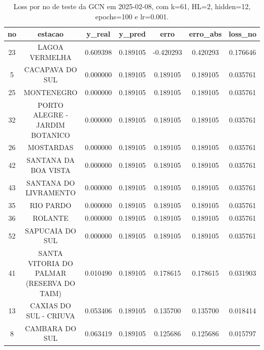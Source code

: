 \begin{table}[h]
\centering
\caption{Loss por no de teste da GCN em 2025-02-08, com k=61, HL=2, hidden=12, epochs=100 e lr=0.001.}
\label{tab:gcn_loss_k61_hl2_h12_e100_d20250208}
\begin{tabular}{ccccccc}
\toprule
no & estacao & y\_real & y\_pred & erro & erro\_abs & loss\_no \\
\midrule
23 & LAGOA VERMELHA & 0.609398 & 0.189105 & -0.420293 & 0.420293 & 0.176646 \\
5 & CACAPAVA DO SUL & 0.000000 & 0.189105 & 0.189105 & 0.189105 & 0.035761 \\
25 & MONTENEGRO & 0.000000 & 0.189105 & 0.189105 & 0.189105 & 0.035761 \\
32 & PORTO ALEGRE - JARDIM BOTANICO & 0.000000 & 0.189105 & 0.189105 & 0.189105 & 0.035761 \\
26 & MOSTARDAS & 0.000000 & 0.189105 & 0.189105 & 0.189105 & 0.035761 \\
42 & SANTANA DA BOA VISTA & 0.000000 & 0.189105 & 0.189105 & 0.189105 & 0.035761 \\
43 & SANTANA DO LIVRAMENTO & 0.000000 & 0.189105 & 0.189105 & 0.189105 & 0.035761 \\
35 & RIO PARDO & 0.000000 & 0.189105 & 0.189105 & 0.189105 & 0.035761 \\
36 & ROLANTE & 0.000000 & 0.189105 & 0.189105 & 0.189105 & 0.035761 \\
52 & SAPUCAIA DO SUL & 0.000000 & 0.189105 & 0.189105 & 0.189105 & 0.035761 \\
41 & SANTA VITORIA DO PALMAR (RESERVA DO TAIM) & 0.010490 & 0.189105 & 0.178615 & 0.178615 & 0.031903 \\
13 & CAXIAS DO SUL - CRIUVA & 0.053406 & 0.189105 & 0.135700 & 0.135700 & 0.018414 \\
8 & CAMBARA DO SUL & 0.063419 & 0.189105 & 0.125686 & 0.125686 & 0.015797 \\
\bottomrule
\end{tabular}
\end{table}
